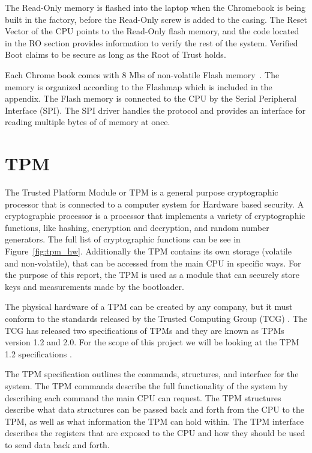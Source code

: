 The Read-Only memory is flashed into the laptop when the Chromebook is being built in the factory, before the Read-Only screw is added to the casing. 
The Reset Vector of the CPU points to the Read-Only flash memory, and the code located in the RO section provides information to verify the rest of the system.
Verified Boot claims to be secure as long as the Root of Trust holds.

Each Chrome book comes with 8 Mbs of non-volatile Flash memory~\cite{fw-summit}.
The memory is organized according to the Flashmap which is included in the appendix.
The Flash memory is connected to the CPU by the Serial Peripheral Interface (SPI).
The SPI driver handles the protocol and provides an interface for reading multiple bytes of of memory at once.

\section{TPM}\label{sec:TPM}

The Trusted Platform Module or TPM is a general purpose cryptographic processor that is connected to a computer system for Hardware based security\cite{TPM}.
A cryptographic processor is a processor that implements a variety of
cryptographic functions, like hashing, encryption and decryption, and random
number generators. The full list of cryptographic functions can be see in
Figure~\ref{fig:tpm_hw}.
Additionally the TPM contains its own storage (volatile and non-volatile), that can be accessed from the main CPU in specific ways.
For the purpose of this report, the TPM is used as a module that can securely store keys and measurements made by the bootloader.

The physical hardware of a TPM can be created by any company, but it must conform to the standards released by the Trusted Computing Group (TCG) \cite{TCG}.
The TCG has released two specifications of TPMs and they are known as TPMs version 1.2 and 2.0.
For the scope of this project we will be looking at the TPM 1.2 specifications \cite{TPM-design}\cite{TPM-struct}\cite{TPM-cmd}.

The TPM specification outlines the commands, structures, and interface for the system.
The TPM commands describe the full functionality of the system by describing each command the main CPU can request.
The TPM structures describe what data structures can be passed back and forth from the CPU to the TPM, as well as what information the TPM can hold within.
The TPM interface describes the registers that are exposed to the CPU and how they should be used to send data back and forth.

